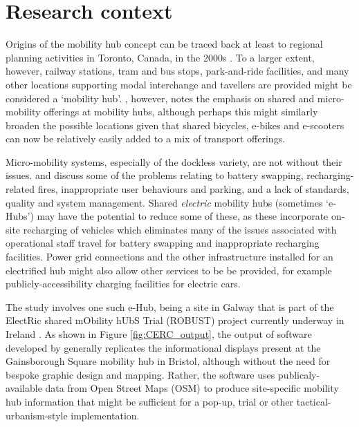 \documentclass[preprint, 3p,
authoryear]{elsarticle} %
\begin{document}
\section{Research context}\label{research-context}

Origins of the mobility hub concept can be traced back at least to
regional planning activities in Toronto, Canada, in the 2000s
\citep[\citet{Metrolinx:2008aa},
\citet{Salsberg:2010aa}]{Engel-Yan:2012aa}. To a larger extent, however,
railway stations, tram and bus stops, park-and-ride facilities, and many
other locations supporting modal interchange and tavellers are provided
might be considered a `mobility hub'. \citet{Roukouni:2023aa}, however,
notes the emphasis on shared and micro-mobility offerings at mobility
hubs, although perhaps this might similarly broaden the possible
locations given that shared bicycles, e-bikes and e-scooters can now be
relatively easily added to a mix of transport offerings.

Micro-mobility systems, especially of the dockless variety, are not
without their issues. \citet{Meigs:2023aa} and \citet{Zhang:2022aa}
discuss some of the problems relating to battery swapping,
recharging-related fires, inappropriate user behaviours and parking, and
a lack of standards, quality and system management. Shared
\emph{electric} mobility hubs (sometimes `e-Hubs') may have the
potential to reduce some of these, as these incorporate on-site
recharging of vehicles which eliminates many of the issues associated
with operational staff travel for battery swapping and inappropriate
recharging facilities. Power grid connections and the other
infrastructure installed for an electrified hub might also allow other
services to be be provided, for example publicly-accessibility charging
facilities for electric cars.

The \citet{Reynolds:2026aa} study involves one such e-Hub, being a site
in Galway that is part of the ElectRic shared mObility hUbS Trial
(ROBUST) project currently underway in Ireland \cite{ROBUST:2025aa}. As
shown in Figure \ref{fig:CERC_output}, the output of software developed
by \citet{Reynolds:2026aa} generally replicates the informational
displays present at the Gainsborough Square mobility hub in Bristol,
although without the need for bespoke graphic design and mapping.
Rather, the software uses publicaly-available data from Open Street Maps
(OSM) to produce site-specific mobility hub information that might be
sufficient for a pop-up, trial or other tactical-urbanism-style
implementation.
\end{document}
